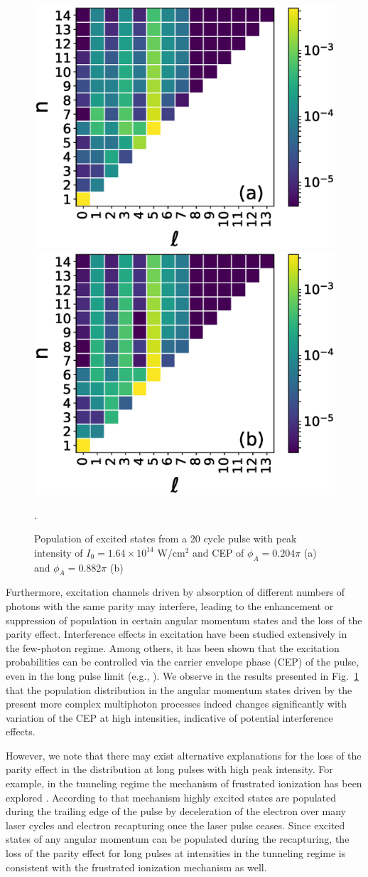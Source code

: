 \begin{figure}[!ht]
\centering
\includegraphics[width=0.49\columnwidth]{figs/Rydberg/heat_cep_test_0p102_20_cyc_16p4e13.eps}
\includegraphics[width=0.49\columnwidth]{figs/Rydberg/heat_cep_test_0p441_20_cyc_16p4e13.eps}
\caption{\label{fig:CEP_Effects_20_cyc}
Population of excited states from a 20 cycle pulse with peak intensity of $I_0 = 1.64 \times 10^{14}$ W/cm$^2$ and CEP of $\phi_A=0.204\pi$ (a) and $\phi_A=0.882\pi$ (b)}.
\end{figure}

Furthermore, excitation channels driven by absorption of different numbers of photons with the same parity may interfere, leading to the enhancement or suppression of population in certain angular momentum states and the loss of the parity effect. Interference effects in excitation have been studied extensively in the few-photon regime. Among others, it has been shown that the excitation probabilities can be controlled via the carrier envelope phase (CEP) of the pulse, even in the long pulse limit (e.g., \cite{zhao2013,zhao2014}). We observe in the results presented in Fig.\ \ref{fig:CEP_Effects_20_cyc} that the population distribution in the angular momentum states driven by the present more complex multiphoton processes indeed changes significantly with variation of the CEP at high intensities, indicative of potential interference effects.

However, we note that there may exist alternative explanations for the loss of the parity effect in the distribution at long pulses with high peak intensity. For example, in the tunneling regime the mechanism of frustrated ionization has been explored \cite{nubbemeyer2008}. According to that mechanism highly excited states are populated during the trailing edge of the pulse by deceleration of the electron over many laser cycles and electron recapturing once the laser pulse ceases. Since excited states of any angular momentum can be populated during the recapturing, the loss of the parity effect for long pulses at intensities in the tunneling regime is consistent with the frustrated ionization mechanism as well.


